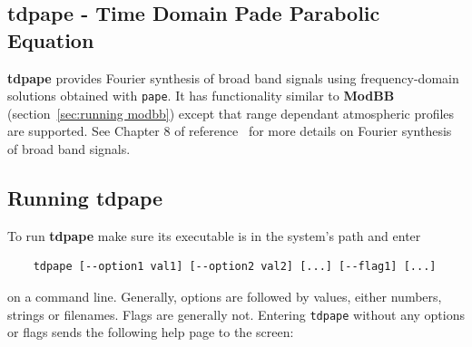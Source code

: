 \subsection{tdpape - Time Domain Pade Parabolic Equation}

{\bf tdpape} provides Fourier synthesis of broad band signals using frequency-domain solutions obtained with \verb"pape". It has functionality similar to {\bf ModBB} (section~\ref{sec:running modbb}) except that range dependant atmospheric profiles are supported. See Chapter 8 of reference~\cite{comp_oc_ac} for more details on Fourier synthesis of broad band signals.  

\subsection{Running tdpape}

To run {\bf tdpape} make sure its executable is in the system's path and enter 
\begin{verbatim} 
    tdpape [--option1 val1] [--option2 val2] [...] [--flag1] [...] 
\end{verbatim}
on a command line. Generally, options are followed by values, either numbers, strings or filenames. Flags are generally not. Entering \verb"tdpape" without any options or flags sends the following help page to the screen: 

